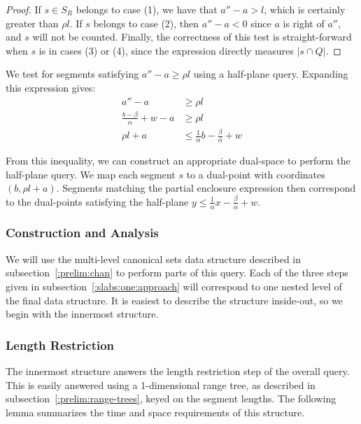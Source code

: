 \begin{proof}
If $s \in S_R$ belongs to case (1), we have that $a'' - a > l$, which is certainly greater than $\rho l$. 
If $s$ belongs to case (2), then $a'' - a < 0$ since $a$ is right of $a''$, and $s$ will not be counted.
Finally, the correctness of this test is straight-forward when $s$ is in cases (3) or (4), since the expression directly measures $|s \cap Q|$.
\end{proof}

We test for segments satisfying $a'' - a \geq \rho l$ using a half-plane query.  Expanding this expression gives:
\[
\begin{split}
a'' - a &\geq \rho l \\
%
\frac{b - \beta}{\alpha} + w - a &\geq \rho l \\
%
\rho l + a &\leq \frac{1}{\alpha} b - \frac{\beta}{\alpha} + w
%
\end{split}
\]

From this inequality, we can construct an appropriate dual-space to perform the half-plane query.  
We map each segment $s$ to a dual-point with coordinates $(b, \rho l + a)$. 
Segments matching the partial enclosure expression then correspond to the dual-points satisfying the half-plane $y \leq \frac{1}{\alpha} x - \frac{\beta}{\alpha} + w$.

\subsubsection{Construction and Analysis}
\label{:slabs:one:analysis}

We will use the multi-level canonical sets data structure described in subsection~\ref{:prelim:chan} to perform parts of this query.
Each of the three steps given in subsection~\ref{:slabs:one:approach} will correspond to one nested level of the final data structure.
It is easiest to describe the structure inside-out, so we begin with the innermost structure.


\subsubsection{Length Restriction}

The innermost structure answers the length restriction step of the overall query. 
This is easily answered using a 1-dimensional range tree, as described in subsection~\ref{:prelim:range-trees}, keyed on the segment lengths. 
The following lemma summarizes the time and space requirements of this structure.

